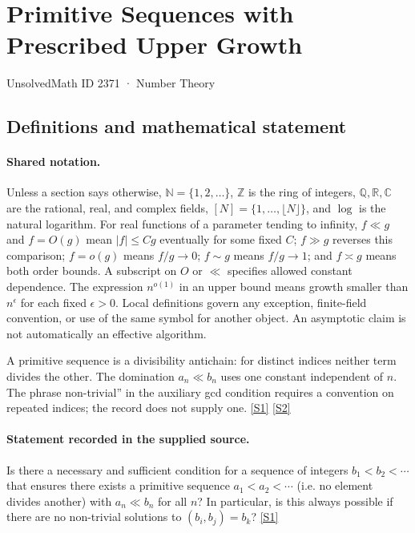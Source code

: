 \documentclass[11pt,a4paper]{article}
\newcommand{\N}{\mathbb{N}}
\newcommand{\Z}{\mathbb{Z}}
\newcommand{\Q}{\mathbb{Q}}
\newcommand{\R}{\mathbb{R}}
\newcommand{\C}{\mathbb{C}}
\newcommand{\sref}[2]{\hyperlink{source:#1:#2}{[S#2]}}
\begin{document}

\setcounter{section}{2370}

\section{Primitive Sequences with Prescribed Upper Growth}\label{2371}

{\small\sffamily UnsolvedMath ID 2371 · Number Theory}

\subsection{Definitions and mathematical statement}

\paragraph{Shared notation.}Unless a section says otherwise, $\N=\{1,2,\ldots\}$,
$\Z$ is the ring of integers, $\Q,\R,\C$ are the rational, real, and complex
fields, $[N]=\{1,\ldots,\lfloor N\rfloor\}$, and $\log$ is the natural
logarithm. For real functions of a parameter tending to infinity,
$f\ll g$ and $f=O(g)$ mean $|f|\leq Cg$ eventually for some fixed $C$;
$f\gg g$ reverses this comparison; $f=o(g)$ means $f/g\to0$;
$f\sim g$ means $f/g\to1$; and $f\asymp g$ means both order bounds.
A subscript on $O$ or $\ll$ specifies allowed constant dependence.
The expression $n^{o(1)}$ in an upper bound means growth smaller than
$n^\epsilon$ for each fixed $\epsilon>0$. Local definitions govern any
exception, finite-field convention, or use of the same symbol for another
object. An asymptotic claim is not automatically an effective algorithm.



A primitive sequence is a divisibility antichain: for distinct indices neither term divides the other. The domination $a_n\ll b_n$ uses one constant independent of $n$. The phrase non-trivial'' in the auxiliary gcd condition requires a convention on repeated indices; the record does not supply one. \sref{2371}{1} \sref{2371}{2}

\paragraph{Statement recorded in the supplied source.}
Is there a necessary and sufficient condition for a sequence of integers $b_1<b_2<\cdots$ that ensures there exists a primitive sequence $a_1<a_2<\cdots$ (i.e. no element divides another) with $a_n \ll b_n$ for all $n$?
In particular, is this always possible if there are no non-trivial solutions to $(b_i,b_j)=b_k$? \sref{2371}{1}
\end{document}
